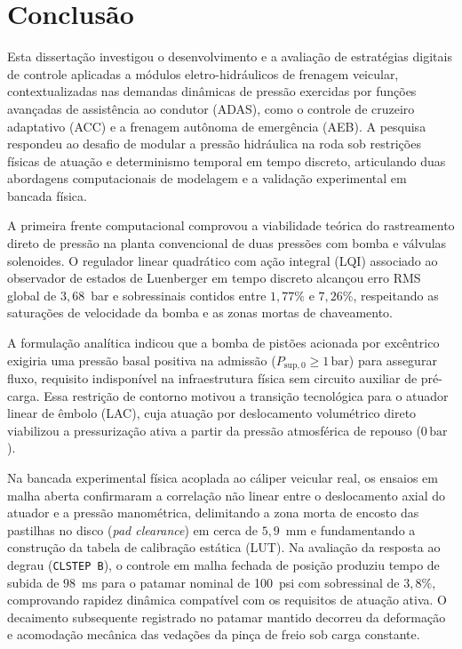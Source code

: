 \chapter[Conclusão]{Conclusão}
\label{chap:conclusao-final}

Esta dissertação investigou o desenvolvimento e a avaliação de estratégias digitais de controle aplicadas a módulos eletro-hidráulicos de frenagem veicular, contextualizadas nas demandas dinâmicas de pressão exercidas por funções avançadas de assistência ao condutor (ADAS), como o controle de cruzeiro adaptativo (ACC) e a frenagem autônoma de emergência (AEB). A pesquisa respondeu ao desafio de modular a pressão hidráulica na roda sob restrições físicas de atuação e determinismo temporal em tempo discreto, articulando duas abordagens computacionais de modelagem e a validação experimental em bancada física.

A primeira frente computacional comprovou a viabilidade teórica do rastreamento direto de pressão na planta convencional de duas pressões com bomba e válvulas solenoides. O regulador linear quadrático com ação integral (LQI) associado ao observador de estados de Luenberger em tempo discreto alcançou erro RMS global de $3{,}68$~bar e sobressinais contidos entre $1{,}77\%$ e $7{,}26\%$, respeitando as saturações de velocidade da bomba e as zonas mortas de chaveamento.

A formulação analítica indicou que a bomba de pistões acionada por excêntrico exigiria uma pressão basal positiva na admissão ($P_{\mathrm{sup},0} \ge 1\,\text{bar}$) para assegurar fluxo, requisito indisponível na infraestrutura física sem circuito auxiliar de pré-carga. Essa restrição de contorno motivou a transição tecnológica para o atuador linear de êmbolo (LAC), cuja atuação por deslocamento volumétrico direto viabilizou a pressurização ativa a partir da pressão atmosférica de repouso ($0\,\text{bar}$).

Na bancada experimental física acoplada ao cáliper veicular real, os ensaios em malha aberta confirmaram a correlação não linear entre o deslocamento axial do atuador e a pressão manométrica, delimitando a zona morta de encosto das pastilhas no disco (\textit{pad clearance}) em cerca de $5{,}9$~mm e fundamentando a construção da tabela de calibração estática (LUT). Na avaliação da resposta ao degrau (\texttt{CLSTEP B}), o controle em malha fechada de posição produziu tempo de subida de $98$~ms para o patamar nominal de 100~psi com sobressinal de $3{,}8\%$, comprovando rapidez dinâmica compatível com os requisitos de atuação ativa. O decaimento subsequente registrado no patamar mantido decorreu da deformação e acomodação mecânica das vedações da pinça de freio sob carga constante.

